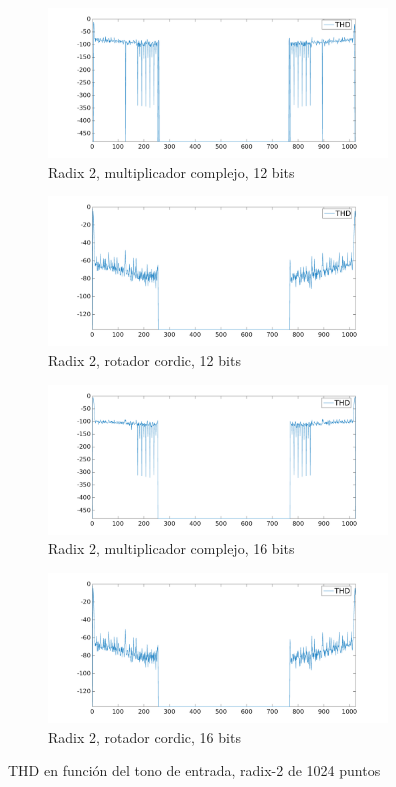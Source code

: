 \begin{figure}[htbp!]
        \advance\leftskip-1.5cm
        \begin{subfigure}{0.6\textwidth}%
        \includegraphics[width=9cm]{./figures/thd_r2_1024_12_mul.png}
        \caption{Radix 2, multiplicador complejo, 12 bits}
        \end{subfigure}%
        \begin{subfigure}{0.6\textwidth}\centering
        \includegraphics[width=9cm]{./figures/thd_r2_1024_12_cor.png}
        \caption{Radix 2, rotador cordic, 12 bits}
        \end{subfigure} 
        \begin{subfigure}{0.6\textwidth}\centering
        \includegraphics[width=9cm]{./figures/thd_r2_1024_16_mul.png}
        \caption{Radix 2, multiplicador complejo, 16 bits}
        \end{subfigure}%
        \begin{subfigure}{0.6\textwidth}\centering
        \includegraphics[width=9cm]{./figures/thd_r2_1024_16_cor.png}
        \caption{Radix 2, rotador cordic, 16 bits}
        \end{subfigure}%
        \caption{THD en función del tono de entrada, radix-2 de 1024 puntos}
        \label{fig:r2_thd_1024}
\end{figure}

